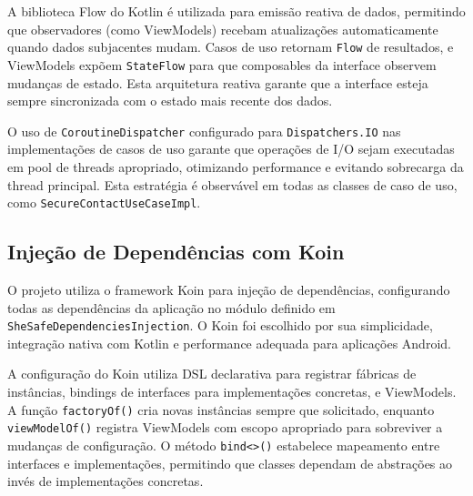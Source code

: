 A biblioteca Flow do Kotlin é utilizada para emissão reativa de dados, permitindo que observadores (como ViewModels) recebam atualizações automaticamente quando dados subjacentes mudam. Casos de uso retornam \texttt{Flow} de resultados, e ViewModels expõem \texttt{StateFlow} para que composables da interface observem mudanças de estado. Esta arquitetura reativa garante que a interface esteja sempre sincronizada com o estado mais recente dos dados.

O uso de \texttt{CoroutineDispatcher} configurado para \texttt{Dispatchers.IO} nas implementações de casos de uso garante que operações de I/O sejam executadas em pool de threads apropriado, otimizando performance e evitando sobrecarga da thread principal. Esta estratégia é observável em todas as classes de caso de uso, como \texttt{SecureContactUseCaseImpl}.

\subsection{Injeção de Dependências com Koin}
O projeto utiliza o framework Koin para injeção de dependências, configurando todas as dependências da aplicação no módulo definido em \texttt{SheSafeDependenciesInjection}. O Koin foi escolhido por sua simplicidade, integração nativa com Kotlin e performance adequada para aplicações Android.

A configuração do Koin utiliza DSL declarativa para registrar fábricas de instâncias, bindings de interfaces para implementações concretas, e ViewModels. A função \texttt{factoryOf()} cria novas instâncias sempre que solicitado, enquanto \texttt{viewModelOf()} registra ViewModels com escopo apropriado para sobreviver a mudanças de configuração. O método \texttt{bind<>()} estabelece mapeamento entre interfaces e implementações, permitindo que classes dependam de abstrações ao invés de implementações concretas.

